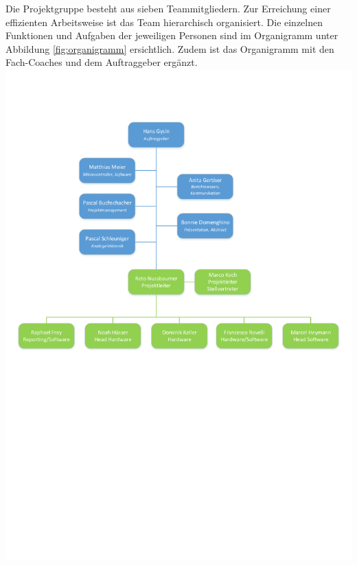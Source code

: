 Die  Projektgruppe besteht  aus sieben  Teammitgliedern. Zur Erreichung  einer
effizienten Arbeitsweise ist das  Team hierarchisch organisiert. Die einzelnen
Funktionen  und Aufgaben  der jeweiligen  Personen sind  im Organigramm  unter
Abbildung \ref{fig:organigramm} ersichtlich. Zudem ist das Organigramm mit den
Fach-Coaches und dem Auftraggeber erg\"anzt.\\

\vspace{-17mm}
{\centering
    \includegraphics[width=175mm,clip=true,trim=0mm 125mm 0mm 10mm]{images/organigramm.pdf} \\
    \label{fig:organigramm}
}
